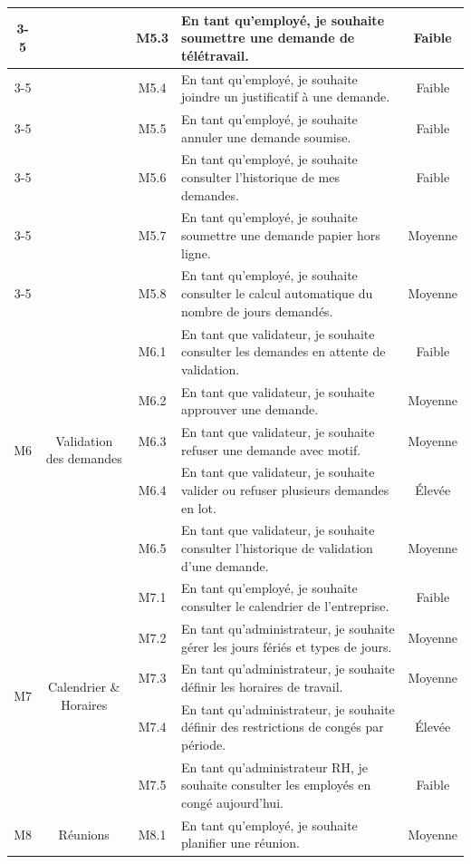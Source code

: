 \begin{longtable}{|c|c|c|p{7.2cm}|c|}
\cline{3-5}
 & & M5.3 & En tant qu'employé, je souhaite soumettre une demande de télétravail. & Faible \\
\cline{3-5}
 & & M5.4 & En tant qu'employé, je souhaite joindre un justificatif à une demande. & Faible \\
\cline{3-5}
 & & M5.5 & En tant qu'employé, je souhaite annuler une demande soumise. & Faible \\
\cline{3-5}
 & & M5.6 & En tant qu'employé, je souhaite consulter l'historique de mes demandes. & Faible \\
\cline{3-5}
 & & M5.7 & En tant qu'employé, je souhaite soumettre une demande papier hors ligne. & Moyenne \\
\cline{3-5}
 & & M5.8 & En tant qu'employé, je souhaite consulter le calcul automatique du nombre de jours demandés. & Moyenne \\
\hline
\multirow{5}{*}{M6} & \multirow{5}{*}{Validation des demandes} & M6.1 & En tant que validateur, je souhaite consulter les demandes en attente de validation. & Faible \\
\cline{3-5}
 & & M6.2 & En tant que validateur, je souhaite approuver une demande. & Moyenne \\
\cline{3-5}
 & & M6.3 & En tant que validateur, je souhaite refuser une demande avec motif. & Moyenne \\
\cline{3-5}
 & & M6.4 & En tant que validateur, je souhaite valider ou refuser plusieurs demandes en lot. & Élevée \\
\cline{3-5}
 & & M6.5 & En tant que validateur, je souhaite consulter l'historique de validation d'une demande. & Moyenne \\
\hline
\multirow{5}{*}{M7} & \multirow{5}{*}{Calendrier \& Horaires} & M7.1 & En tant qu'employé, je souhaite consulter le calendrier de l'entreprise. & Faible \\
\cline{3-5}
 & & M7.2 & En tant qu'administrateur, je souhaite gérer les jours fériés et types de jours. & Moyenne \\
\cline{3-5}
 & & M7.3 & En tant qu'administrateur, je souhaite définir les horaires de travail. & Moyenne \\
\cline{3-5}
 & & M7.4 & En tant qu'administrateur, je souhaite définir des restrictions de congés par période. & Élevée \\
\cline{3-5}
 & & M7.5 & En tant qu'administrateur RH, je souhaite consulter les employés en congé aujourd'hui. & Faible \\
\hline
\multirow{4}{*}{M8} & \multirow{4}{*}{Réunions} & M8.1 & En tant qu'employé, je souhaite planifier une réunion. & Moyenne \\

\end{longtable}
